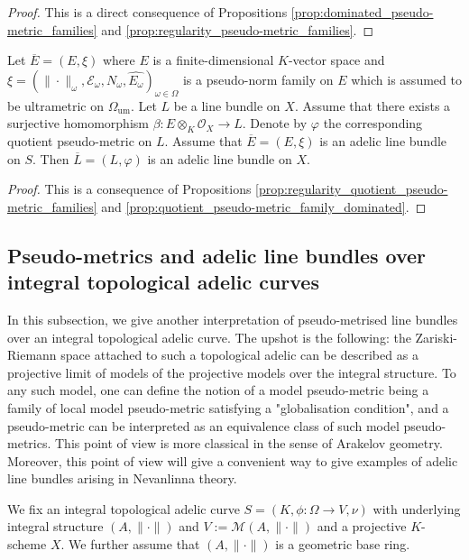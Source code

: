 \documentclass [11pt,reqno]{amsart}
\newcommand{\1}{\mathmybb{1}}
\def\cE{{\mathcal{E}}}
\def\cM{{\mathcal{M}}}
\def\cO{{\mathcal{O}}}
\def\um{\operatorname{um}}
\begin{document}
\begin{proof}
This is a direct consequence of Propositions \ref{prop:dominated_pseudo-metric_families} and \ref{prop:regularity_pseudo-metric_families}.
\end{proof}

\begin{proposition} 
\label{prop:quotient_adelic_line_bundle}
Let $\overline{E}=(E,\xi)$ where $E$ is a finite-dimensional $K$-vector space and $\xi=(\|\cdot\|_{\omega},\cE_{\omega},N_{\omega},\widehat{E_{\omega}})_{\omega\in\Omega}$ is a pseudo-norm family on $E$ which is assumed to be ultrametric on $\Omega_{\um}$. Let $L$ be a line bundle on $X$. Assume that there exists a surjective homomorphism $\beta:E\otimes_{K}\cO_{X}\to L$. Denote by $\varphi$ the corresponding quotient pseudo-metric on $L$. Assume that $\overline{E}=(E,\xi)$ is an adelic line bundle on $S$. Then $\overline{L}=(L,\varphi)$ is an adelic line bundle on $X$.
\end{proposition}

\begin{proof}
This is a consequence of Propositions \ref{prop:regularity_quotient_pseudo-metric_families} and \ref{prop:quotient_pseudo-metric_family_dominated}. 
\end{proof}

\subsection{Pseudo-metrics and adelic line bundles over integral topological adelic curves}
\label{sub:pseudo-metric_families_integral_tac}

In this subsection, we give another interpretation of pseudo-metrised line bundles over an integral topological adelic curve. The upshot is the following: the Zariski-Riemann space attached to such a topological adelic can be described as a projective limit of models of the projective models over the integral structure. To any such model, one can define the notion of a model pseudo-metric being a family of local model pseudo-metric satisfying a "globalisation condition", and a pseudo-metric can be interpreted as an equivalence class of such model pseudo-metrics. This point of view is more classical in the sense of Arakelov geometry. Moreover, this point of view will give a convenient way to give examples of adelic line bundles arising in Nevanlinna theory.

We fix an integral topological adelic curve $S=(K,\phi:\Omega\to V,\nu)$ with underlying integral structure $(A,\|\cdot\|)$ and $V:= \cM(A,\|\cdot\|)$ and a projective $K$-scheme $X$. We further assume that $(A,\|\cdot\|)$ is a geometric base ring. %
\end{document}
